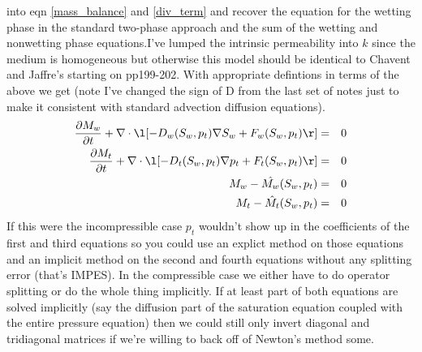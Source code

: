 \documentclass[12pt,dvips]{report}
\begin{document}
into eqn \ref{mass_balance} and \ref{div_term} and recover the
equation for the wetting phase in the standard two-phase approach and
the sum of the wetting and nonwetting phase equations.I've lumped the
intrinsic permeability into $k$ since the medium is homogeneous but
otherwise this model should be identical to Chavent and Jaffre's
starting on pp199-202. With appropriate defintions in terms of the
above we get (note I've changed the sign of D from the last set of
notes just to make it consistent with standard advection diffusion
equations).
\begin{eqnarray}
\pd{M_w}{t} + \deld \l[ -D_w(S_w,p_t) \grad S_w + F_w(S_w,p_t) \r] &=&0 \\
\pd{M_t}{t} + \deld \l[ -D_t(S_w,p_t) \grad p_t+ F_t(S_w,p_t) \r] &=&0 \\
M_w - \hat{M_w}(S_w,p_t) &=& 0 \\
M_t - \hat{M_t}(S_w,p_t) &=& 0
\end{eqnarray}
If this were the incompressible case $p_t$ wouldn't show up in the
coefficients of the first and third equations so you could use an
explict method on those equations and an implicit method on the second
and fourth equations without any splitting error (that's IMPES). In
the compressible case we either have to do operator splitting or do
the whole thing implicitly. If at least part of both equations are
solved implicitly (say the diffusion part of the saturation equation
coupled with the entire pressure equation) then we could still only
invert diagonal and tridiagonal matrices if we're willing to back off
of Newton's method some. 
\end{document}
